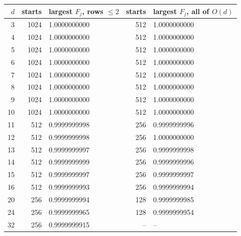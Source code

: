 \begin{tabular}{r r l r l}
\toprule
$d$ & starts & largest $F_j$, rows $\le2$ & starts & largest $F_j$, all of $O(d)$ \\
\midrule
3 & 1024 & 1.0000000000 & 512 & 1.0000000000 \\
4 & 1024 & 1.0000000000 & 512 & 1.0000000000 \\
5 & 1024 & 1.0000000000 & 512 & 1.0000000000 \\
6 & 1024 & 1.0000000000 & 512 & 1.0000000000 \\
7 & 1024 & 1.0000000000 & 512 & 1.0000000000 \\
8 & 1024 & 1.0000000000 & 512 & 1.0000000000 \\
9 & 1024 & 1.0000000000 & 512 & 1.0000000000 \\
10 & 1024 & 1.0000000000 & 512 & 1.0000000000 \\
11 & 512 & 0.9999999998 & 256 & 0.9999999996 \\
12 & 512 & 0.9999999998 & 256 & 1.0000000000 \\
13 & 512 & 0.9999999997 & 256 & 0.9999999998 \\
14 & 512 & 0.9999999999 & 256 & 0.9999999996 \\
15 & 512 & 0.9999999997 & 256 & 0.9999999997 \\
16 & 512 & 0.9999999993 & 256 & 0.9999999994 \\
20 & 256 & 0.9999999994 & 128 & 0.9999999985 \\
24 & 256 & 0.9999999965 & 128 & 0.9999999954 \\
32 & 256 & 0.9999999915 & -- & -- \\
\bottomrule
\end{tabular}
